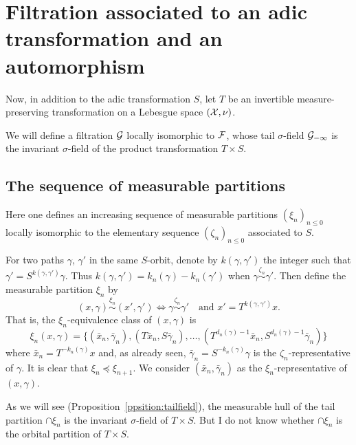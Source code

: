 \documentclass[12pt,a4paper]{article}
\begin{document}
\section{Filtration associated to an adic transformation and an automorphism}


Now, in addition to the adic transformation $S$, let $T$ be an invertible 
 measure-preserving transformation on a Lebesgue space $(\mathcal{X}, \nu)$. 

We will define a filtration $\mathcal{G}$ locally isomorphic to $\mathcal{F}$, whose 
tail $\sigma$-field $\mathcal{G}_{-\infty}$ is the invariant $\sigma$-field of 
the product transformation $T \times S$. 


\subsection{The sequence of measurable partitions}

Here one defines an increasing sequence of measurable partitions ${(\xi_n)}_{n \leq 0}$ 
locally isomorphic to the elementary sequence ${(\zeta_n)}_{n \leq 0}$ associated to $S$. 

For two paths $\gamma$, $\gamma'$ in the same $S$-orbit, denote by $k(\gamma,\gamma')$ 
the integer such that $\gamma'=S^{k(\gamma,\gamma')}\gamma$. 
Thus $k(\gamma,\gamma') = k_n(\gamma)-k_n(\gamma')$ when $\gamma \overset{\zeta_n}{\sim} \gamma'$. 
Then define the measurable partition $\xi_n$ by 
$$
\boxed{(x, \gamma) \overset{\xi_n}{\sim} (x', \gamma') \iff 
\gamma \overset{\zeta_n}{\sim} \gamma' \quad 
\text{and $x'=T^{k(\gamma,\gamma')}x$}}. 
$$
That is, the $\xi_n$-equivalence class of $(x,\gamma)$ is 
$$
\boxed{\xi_n(x,\gamma) = \bigl\{(\bar x_n, \bar\gamma_n), (T\bar x_n, S\bar\gamma_n), 
\ldots, (T^{d_n(\gamma)-1}\bar x_n, S^{d_n(\gamma)-1}\bar\gamma_n) \bigr\}}
$$
where $\bar x_n = T^{-k_n(\gamma)}x$ and, as already seen, 
$\bar\gamma_n = S^{-k_n(\gamma)}\gamma$ is the $\zeta_n$-representative of 
$\gamma$. 
It is clear that $\xi_n \preceq \xi_{n+1}$. 
We  consider $(\bar x_n, \bar\gamma_n)$ as the $\xi_n$-representative of
$(x,\gamma)$. 

\begin{remark}
As we will see (Proposition~\ref{ppsition:tailfield}), 
the measurable hull of the tail partition $\cap \xi_n$ is 
the invariant $\sigma$-field of $T \times S$. 
But I do not know whether $\cap \xi_n$ 
is the orbital partition of $T \times S$.
\end{remark}
\end{document}
